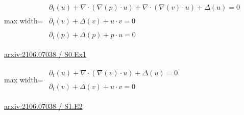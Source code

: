 \documentclass[UTF8,10pt,a4paper,fontset=mac]{ctexart}
\begin{document}
\begin{minipage}{\linewidth}\begin{center}\begin{adjustbox}{max width=\linewidth}$\displaystyle\begin{gathered}\begin{gathered}\partial_{t}(u)+\nabla\cdot(\nabla(p)\cdot u)+\nabla\cdot(\nabla(v)\cdot u)+\Delta(u)=0\end{gathered}\\[5pt]\begin{gathered}\partial_{t}(v)+\Delta(v)+u\cdot v=0\end{gathered}\\[5pt]\begin{gathered}\partial_{t}(p)+\Delta(p)+p\cdot u=0\end{gathered}\end{gathered}$\end{adjustbox}\end{center}{\small\href{https://arxiv.org/html/2106.07038#S0.Ex1}{arxiv:2106.07038 / S0.Ex1}}\par\end{minipage}\par\vspace{6mm}

\begin{minipage}{\linewidth}\begin{center}\begin{adjustbox}{max width=\linewidth}$\displaystyle\begin{gathered}\begin{gathered}\partial_{t}(u)+\nabla\cdot(\nabla(v)\cdot u)+\Delta(u)=0\end{gathered}\\[5pt]\begin{gathered}\partial_{t}(v)+\Delta(v)+u\cdot v=0\end{gathered}\end{gathered}$\end{adjustbox}\end{center}{\small\href{https://arxiv.org/html/2106.07038#S1.E2}{arxiv:2106.07038 / S1.E2}}\par\end{minipage}\par\vspace{6mm}
\end{document}
